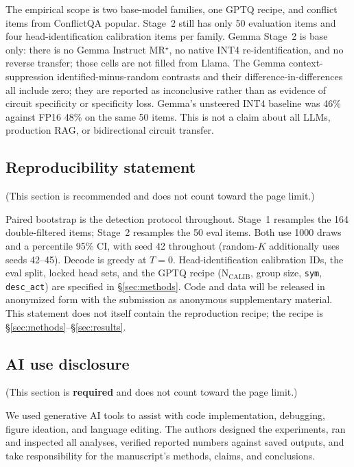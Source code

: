 \documentclass{article} %
\begin{document}
The empirical scope is two base-model families, one GPTQ recipe, and conflict items from ConflictQA popular. Stage~2 still has only 50 evaluation items and four head-identification calibration items per family. Gemma Stage~2 is base only: there is no Gemma Instruct MR$^\star$, no native INT4 re-identification, and no reverse transfer; those cells are not filled from Llama. The Gemma context-suppression identified-minus-random contrasts and their difference-in-differences all include zero; they are reported as inconclusive rather than as evidence of circuit specificity or specificity loss. Gemma's unsteered INT4 baseline was 46\% against FP16 48\% on the same 50 items. This is not a claim about all LLMs, production RAG, or bidirectional circuit transfer.

\subsection*{Reproducibility statement}

(This section is recommended and does not count toward the page limit.)

Paired bootstrap is the detection protocol throughout. Stage~1 resamples the 164 double-filtered items; Stage~2 resamples the 50 eval items. Both use 1000 draws and a percentile 95\% CI, with seed 42 throughout (random-$K$ additionally uses seeds 42--45). Decode is greedy at $T{=}0$. Head-identification calibration IDs, the eval split, locked head sets, and the GPTQ recipe ($\mathrm{N_{CALIB}}$, group size, \texttt{sym}, \texttt{desc\_act}) are specified in \S\ref{sec:methods}. Code and data will be released in anonymized form with the submission as anonymous supplementary material. This statement does not itself contain the reproduction recipe; the recipe is \S\ref{sec:methods}--\S\ref{sec:results}.

\subsection*{AI use disclosure}
\label{sec:ai}

(This section is \textbf{required} and does not count toward the page limit.)

We used generative AI tools to assist with code implementation, debugging, figure ideation, and language editing. The authors designed the experiments, ran and inspected all analyses, verified reported numbers against saved outputs, and take responsibility for the manuscript's methods, claims, and conclusions.
\end{document}
